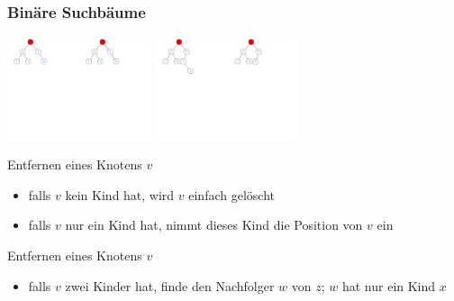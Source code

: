 \documentclass[aspectratio=1610, 11pt]{beamer}
\newcommand{\mytitle}{Bin\"are Suchb\"aume}
\begin{document}
\begin{frame}\frametitle{\mytitle}
	\begin{overprint}
		\includegraphics[height=30mm]{./images/binary_searchtree3.pdf}\hfill\includegraphics[height=30mm]{./images/binary_searchtree4.pdf}
		\onslide<2>\includegraphics[height=30mm]{./images/binary_searchtree5.pdf}\hfill\includegraphics[height=30mm]{./images/binary_searchtree6.pdf}
	\end{overprint}
	\begin{overprint}
		\onslide<1>
		\begin{exampleblock}{Entfernen eines Knotens $v$}
			\begin{itemize}
				\item falls $v$ kein Kind hat, wird $v$ einfach gel\"oscht
				\item falls $v$ nur ein Kind hat, nimmt dieses Kind die Position von $v$ ein
			\end{itemize}
		\end{exampleblock}
		\onslide<2>
		\begin{exampleblock}{Entfernen eines Knotens $v$}
			\begin{itemize}
				\item falls $v$ zwei Kinder hat, finde den Nachfolger $w$ von $z$; $w$ hat nur ein Kind $x$

\end{itemize}
\end{exampleblock}
\end{overprint}
\end{frame}
\end{document}
